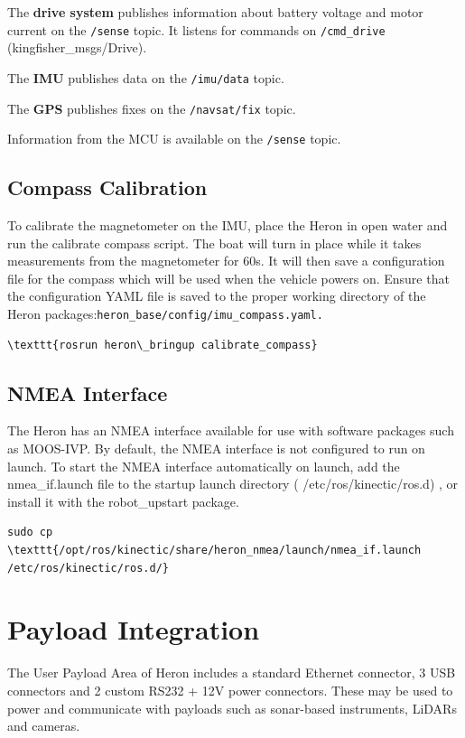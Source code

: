 \documentclass[]{clearpath-latex/clearpath-manual}
\begin{document}
The \textbf{drive system} publishes information about battery voltage and motor current on the \lstinline{/sense} topic. It listens for commands on \lstinline{/cmd_drive} (kingfisher\_msgs/Drive).

The \textbf{IMU} publishes data on the \lstinline{/imu/data} topic.

The \textbf{GPS} publishes fixes on the \lstinline{/navsat/fix} topic.

Information from the MCU is available on the \lstinline{/sense} topic.

\subsection{Compass Calibration}

To calibrate the magnetometer on the IMU, place the Heron in open water and run the calibrate compass script. The boat will turn in place while it takes measurements from the magnetometer for 60s. It will then save a configuration file for the compass which will be used when the vehicle powers on. Ensure that the configuration YAML file is saved to the proper working directory of the Heron packages:\texttt{heron\_base/config/imu\_compass.yaml.}

\begin{lstlisting}
\texttt{rosrun heron\_bringup calibrate_compass}
\end{lstlisting}

\subsection{NMEA Interface}

The Heron has an NMEA interface available for use with software packages such as MOOS-IVP. By default, the NMEA interface is not configured to run on launch. To start the NMEA interface automatically on launch, add the nmea\_if.launch file to the startup launch directory ( /etc/ros/kinectic/ros.d) , or install it with the robot\_upstart package.
\begin{lstlisting}
sudo cp \texttt{/opt/ros/kinectic/share/heron_nmea/launch/nmea_if.launch /etc/ros/kinectic/ros.d/}
\end{lstlisting}

\newpage

\section{Payload Integration}
The User Payload Area of Heron includes a standard Ethernet connector, 3 USB connectors and 2 custom RS232 + 12V power connectors. These may be used to power and communicate with payloads such as sonar-based instruments, LiDARs and cameras.
\end{document}
